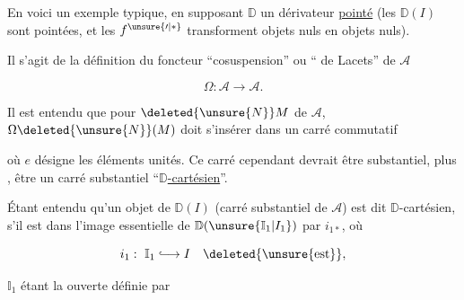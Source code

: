 En voici un exemple typique, en supposant $\mathbb D$ un dérivateur \uline{pointé} (les $\mathbb D(I)$ sont pointées, et les $f^{\unsure{\prime|*}}$ transforment objets nuls en objets nuls).

Il s'agit de la définition du foncteur  ``cosuspension'' ou `` de Lacets'' de $\mathcal A$

\[
\Omega:\mathcal A\longrightarrow\mathcal A.
\]

Il est entendu que pour $\deleted{\unsure{N}}M$ de $\mathcal A$, $\Omega\deleted{\unsure{N}}(M)$ doit s'insérer dans un carré commutatif


où $e$ désigne les éléments unités. Ce carré cependant devrait être substantiel, plus , être un carré substantiel ``\uline{$\mathbb D$-cartésien}''.

Étant entendu qu'un objet de $\mathbb D(I)$  (carré substantiel de $\mathcal A$) est dit $\mathbb D$-cartésien, s'il est dans l'image essentielle de $\mathbb D(\unsure{\mathbb I_1|I_1})$ par $i_{1*}$, où

\[
i_1:\ \mathbb I_1\lhook\joinrel\longrightarrow I\quad\deleted{\unsure{\mathrm{est}}},
\]

 $\mathbb I_1$ étant la  ouverte  définie par

